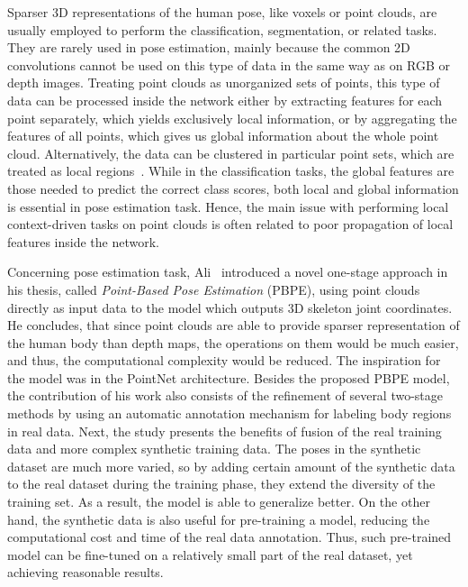 \noindent %
Sparser 3D representations of the human pose, like voxels or point clouds, are usually employed to perform the classification, segmentation, or related tasks. They are rarely used in pose estimation, mainly because the common 2D convolutions cannot be used on this type of data in the same way as on RGB or depth images. Treating point clouds as unorganized sets of points, this type of data can be processed inside the network either by extracting features for each point separately, which yields exclusively local information, or by aggregating the features of all points, which gives us global information about the whole point cloud. Alternatively, the data can be clustered in particular point sets, which are treated as local regions~\cite{DBLP:journals/corr/abs-1811-07246}. While in the classification tasks, the global features are those needed to predict the correct class scores, both local and global information is essential in pose estimation task. Hence, the main issue with performing local context-driven tasks on point clouds is often related to poor propagation of local features inside the network.\par
\vspace{5mm}
\noindent Concerning pose estimation task, Ali~\cite{Ali19} introduced a novel one-stage approach in his thesis, called \textit{Point-Based Pose Estimation} (PBPE), using point clouds directly as input data to the model which outputs 3D skeleton joint coordinates. He concludes, that since point clouds are able to provide sparser representation of the human body than depth maps, the operations on them would be much easier, and thus, the computational complexity would be reduced. The inspiration for the model was in the PointNet architecture. Besides the proposed PBPE model, the contribution of his work also consists of the refinement of several two-stage methods by using an automatic annotation mechanism for labeling body regions in real data. Next, the study presents the benefits of fusion of the real training data and more complex synthetic training data. The poses in the synthetic dataset are much more varied, so by adding certain amount of the synthetic data to the real dataset during the training phase, they extend the diversity of the training set. As a result, the model is able to generalize better. On the other hand, the synthetic data is also useful for pre-training a model, reducing the computational cost and time of the real data annotation. Thus, such pre-trained model can be fine-tuned on a relatively small part of the real dataset, yet achieving reasonable results. \par

